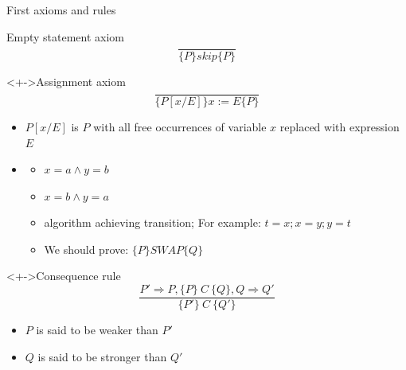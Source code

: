 \begin{frame}{First axioms and rules}
  \begin{block}{Empty statement axiom}\vspace{-2\baselineskip}
    $$\frac{}{\{P\} skip \{P\}}$$
  \end{block}

  \begin{block}<+->{Assignment axiom}\vspace{-2\baselineskip}
    $$\frac{}{\{P[x/E]\} x:=E \{P\}}$$
    \begin{itemize}
    \item $P[x/E]$ is $P$ with all free occurrences of variable $x$ replaced
      with expression $E$
    \item {}
      \begin{itemize}
      \item {} $x=a\wedge y=b$
      \item {} $x=b\wedge y=a$
      \item {} algorithm achieving transition; For example:
        $t=x; x=y; y=t$
      \item We should prove: $\{P\} SWAP \{Q\}$
      \end{itemize}
    \end{itemize}
  \end{block}

  \begin{block}<+->{Consequence rule}\vspace{-2\baselineskip}
    $$\frac{P'\Rightarrow P, \{P\} ~C~ \{Q\}, Q\Rightarrow Q'}{\{P'\} ~C~ \{Q'\}}$$    
    \begin{itemize}
    \item $P$ is said to be weaker than $P'$
    \item $Q$ is said to be stronger than $Q'$
    \end{itemize}
  \end{block}

\end{frame}
